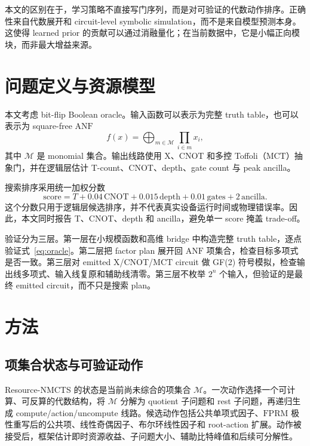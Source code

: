 \documentclass[UTF8,fontset=macnew,11pt]{ctexart}
\newcommand{\method}{Resource-NMCTS}
\newcommand{\anf}{\ensuremath{\mathrm{ANF}}}
\newcommand{\fprm}{\ensuremath{\mathrm{FPRM}}}
\newcommand{\mct}{\ensuremath{\mathrm{MCT}}}
\newcommand{\score}{\ensuremath{\mathrm{score}}}
\newcommand{\ttable}{truth table}
\begin{document}
本文的区别在于，学习策略不直接写门序列，而是对可验证的代数动作排序。正确性来自代数展开和 circuit-level symbolic simulation，而不是来自模型预测本身。这使得 learned prior 的贡献可以通过消融量化；在当前数据中，它是小幅正向模块，而非最大增益来源。

\section{问题定义与资源模型}

本文考虑 bit-flip Boolean oracle。输入函数可以表示为完整 \ttable{}，也可以表示为 square-free \anf{}
\begin{equation}
  f(x)=\bigoplus_{m\in\mathcal{M}}\prod_{i\in m}x_i ,
  \label{eq:anf}
\end{equation}
其中 $\mathcal{M}$ 是 monomial 集合。输出线路使用 X、CNOT 和多控 Toffoli（\mct{}）抽象门，并在逻辑层估计 T-count、CNOT、depth、gate count 与 peak ancilla。

搜索排序采用统一加权分数
\begin{equation}
  \score = T + 0.04\,\mathrm{CNOT} + 0.015\,\mathrm{depth}
         + 0.01\,\mathrm{gates} + 2\,\mathrm{ancilla}.
  \label{eq:score}
\end{equation}
这个分数只用于逻辑层候选排序，并不代表真实设备运行时间或物理错误率。因此，本文同时报告 T、CNOT、depth 和 ancilla，避免单一 score 掩盖 trade-off。

验证分为三层。第一层在小规模函数和高维 bridge 中构造完整 \ttable{}，逐点验证式~\eqref{eq:oracle}。第二层把 factor plan 展开回 \anf{} 项集合，检查目标多项式是否一致。第三层对 emitted X/CNOT/\mct{} circuit 做 GF(2) 符号模拟，检查输出线多项式、输入线复原和辅助线清零。第三层不枚举 $2^n$ 个输入，但验证的是最终 emitted circuit，而不只是搜索 plan。

\section{方法}

\subsection{项集合状态与可验证动作}

\method{} 的状态是当前尚未综合的项集合 $\mathcal{M}$。一次动作选择一个可计算、可反算的代数结构，将 $\mathcal{M}$ 分解为 quotient 子问题和 rest 子问题，再递归生成 compute/action/uncompute 线路。候选动作包括公共单项式因子、\fprm{} 极性重写后的公共项、线性奇偶因子、布尔环线性因子和 root-action 扩展。动作被接受后，框架估计即时资源收益、子问题大小、辅助比特峰值和后续可分解性。
\end{document}
